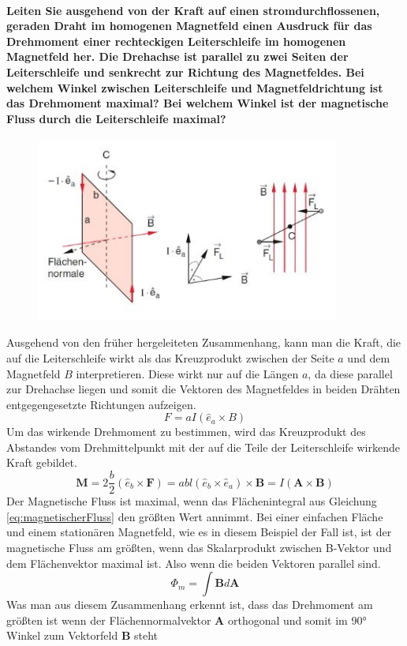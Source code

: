 \documentclass[a4paper, 11pt, ngerman, parskip=half-]{scrartcl}
\begin{document}
\paragraph{Leiten Sie ausgehend von der Kraft auf einen stromdurchflossenen, geraden Draht im
    homogenen Magnetfeld einen Ausdruck für das Drehmoment einer rechteckigen Leiterschleife im
    homogenen Magnetfeld her. Die Drehachse ist parallel zu zwei Seiten der Leiterschleife und senkrecht
    zur Richtung des Magnetfeldes. Bei welchem Winkel zwischen Leiterschleife und Magnetfeldrichtung ist
    das Drehmoment maximal? Bei welchem Winkel ist der magnetische Fluss durch die Leiterschleife
    maximal?}
\begin{figure}[H]
    \centering
    \label{Drehmoment}
    \includegraphics[height=6cm]{image/05/5.5.JPG}
\end{figure}
Ausgehend von den früher hergeleiteten Zusammenhang, kann man die Kraft, die auf die Leiterschleife wirkt als das Kreuzprodukt zwischen der Seite $a$ und dem Magnetfeld $B$ interpretieren.
Diese wirkt nur auf die Längen $a$, da diese parallel zur Drehachse liegen und somit die Vektoren des Magnetfeldes in beiden Drähten entgegengesetzte Richtungen aufzeigen.
\begin{equation}
    F = a I ( \hat{e}_a \times B)
\end{equation}
Um das wirkende Drehmoment zu bestimmen, wird das Kreuzprodukt des Abstandes vom Drehmittelpunkt mit der auf die Teile der Leiterschleife wirkende Kraft gebildet.
\begin{equation}
    \textbf{M} = 2\frac{b}{2} ( \hat{e}_b \times \textbf{F}) = abl (\hat{e}_b \times \hat{e}_a) \times \textbf{B} = I(\textbf{A}\times\textbf{B})
\end{equation}
Der Magnetische Fluss ist maximal, wenn das Flächenintegral aus Gleichung \ref{eq:magnetischerFluss} den größten Wert annimmt. Bei einer einfachen Fläche und einem stationären Magnetfeld, wie es in diesem Beispiel der Fall ist, ist der magnetische Fluss am größten, wenn das
Skalarprodukt zwischen B-Vektor und dem Flächenvektor maximal ist. Also wenn die beiden Vektoren parallel sind.
\begin{equation}
    \label{eq:magnetischerFluss}
    \Phi_m = \int \textbf{B} d\textbf{A}
\end{equation}
Was man aus diesem Zusammenhang erkennt ist, dass das Drehmoment am größten ist wenn der Flächennormalvektor $\textbf{A}$ orthogonal und somit im 90° Winkel zum Vektorfeld $\textbf{B}$ steht
\end{document}
